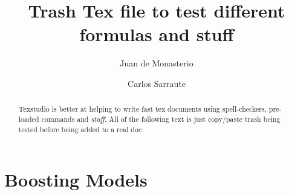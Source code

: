 \documentclass{article}%
\newcommand{\Expect}{{\mathbb{E}}}
\newtheorem{definition}{Definition}[subsection]
\theoremstyle{definition}
\begin{document}

\title{Trash Tex file to test different formulas and stuff}




\author{
	Juan de Monasterio
	\and Carlos Sarraute
}

%
%


\maketitle
\begin{abstract}
	
	Texstudio is better at helping to write fast tex documents using spell-checkers, pre-loaded commands and \textit{stuff}. All of the following text is just copy/paste trash being tested before being added to a real doc.
	



\end{abstract} 

\section{Boosting Models}\label{section-boosting}
\end{document}
